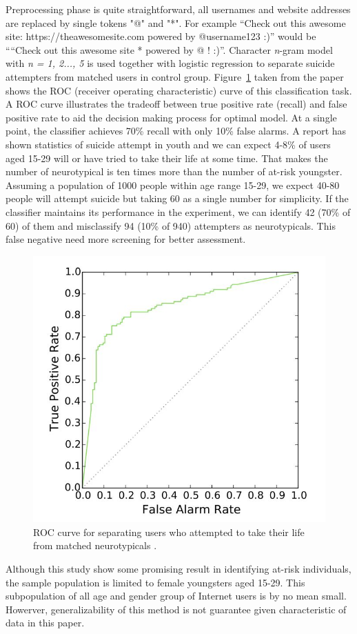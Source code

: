Preprocessing phase is quite straightforward, all usernames and website addresses are replaced by single tokens "@" and "*". For example “Check out this awesome site: https://theawesomesite.com powered by @username123 :)” would be ““Check out this awesome site * powered by @ ! :)”. Character \textit{n}-gram model with \textit{n = 1, 2..., 5} is used together with logistic regression to separate suicide attempters from matched users in control group. Figure~\ref{fig:roc_curve} taken from the paper \cite{Coppersmith2016} shows the ROC (receiver operating characteristic) curve of this classification task. A ROC curve illustrates the tradeoff between true positive rate (recall) and false positive rate to aid the decision making process for optimal model. At a single point, the classifier achieves 70\% recall with only 10\% false alarms. A report \cite{Kann2016} has shown statistics of suicide attempt in youth and we can expect 4-8\% of users aged 15-29 will or have tried to take their life at some time. That makes the number of neurotypical is ten times more than the number of at-risk youngster. Assuming a population of 1000 people within age range 15-29, we expect 40-80 people will attempt suicide but taking 60 as a single number for simplicity. If the classifier maintains its performance in the experiment, we can identify 42 (70\% of 60) of them and misclassify 94 (10\% of 940) attempters as neurotypicals. This false negative need more screening for better assessment.
\begin{figure}
\centering
\includegraphics[width=\textwidth, clip=true]{img/ROC_curve}
\caption{ROC curve for separating users who attempted to take their life from matched neurotypicals \cite{Coppersmith2016}.} 
\label{fig:roc_curve}
\end{figure}
Although this study show some promising result in identifying at-risk individuals, the sample population is limited to female youngsters aged 15-29. This subpopulation of all age and gender group of Internet users is by no mean small. Howerver, generalizability of this method is not guarantee given characteristic of data in this paper.\\

